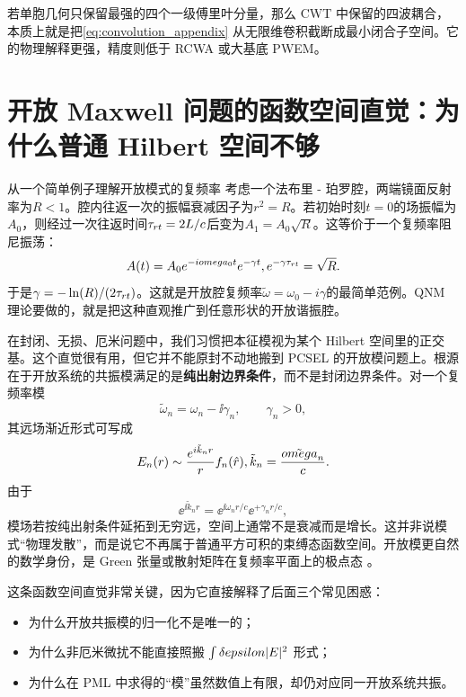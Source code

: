 若单胞几何只保留最强的四个一级傅里叶分量，那么 CWT 中保留的四波耦合，本质上就是把\cref{eq:convolution_appendix} 从无限维卷积截断成最小闭合子空间。它的物理解释更强，精度则低于 RCWA 或大基底 PWEM。

\section{开放 Maxwell 问题的函数空间直觉：为什么普通 Hilbert 空间不够}

\begin{PrerequisiteBox}{从一个简单例子理解开放模式的复频率}
考虑一个法布里 - 珀罗腔，两端镜面反射率为$R<1$。腔内往返一次的振幅衰减因子为$r^2=R$。若初始时刻$t=0$的场振幅为$A_0$，则经过一次往返时间$\tau_{\rm rt}=2L/c$后变为$A_1=A_0\sqrt{R}$。这等价于一个复频率阻尼振荡：
\[
A(t) = A_0\ee^{-\ii\omega_0 t}\ee^{-\gamma t},\qquad
\ee^{-\gamma\tau_{\rm rt}} = \sqrt{R}.
\]
于是$\gamma = -\ln(R)/(2\tau_{\rm rt})$。这就是开放腔复频率$\tilde{\omega}=\omega_0-i\gamma$的最简单范例。QNM 理论要做的，就是把这种直观推广到任意形状的开放谐振腔。
\end{PrerequisiteBox}

在封闭、无损、厄米问题中，我们习惯把本征模视为某个 Hilbert 空间里的正交基。这个直觉很有用，但它并不能原封不动地搬到 PCSEL 的开放模问题上。根源在于开放系统的共振模满足的是\textbf{纯出射边界条件}，而不是封闭边界条件。对一个复频率模
\begin{equation}
\tilde{\omega}_n=\omega_n-\ii\gamma_n,
\qquad \gamma_n>0,
\label{eq:complex_frequency_qnm_appendix}
\end{equation}
其远场渐近形式可写成
\begin{equation}
\E_n(\rvec)\sim \frac{\ee^{\ii \tilde{k}_n r}}{r}\bm{f}_n(\hat{\rvec}),
\qquad
\tilde{k}_n=\frac{\tilde{\omega}_n}{c}.
\label{eq:qnm_asymptotic_appendix}
\end{equation}
由于
\begin{equation}
\ee^{\ii \tilde{k}_n r}
=
\ee^{\ii \omega_n r/c}\ee^{+\gamma_n r/c},
\label{eq:qnm_spatial_growth_appendix}
\end{equation}
模场若按纯出射条件延拓到无穷远，空间上通常不是衰减而是增长。这并非说模式“物理发散”，而是说它不再属于普通平方可积的束缚态函数空间。开放模更自然的数学身份，是 Green 张量或散射矩阵在复频率平面上的极点态 \cite{leung1994complete,alpeggiani2017qnm}。

这条函数空间直觉非常关键，因为它直接解释了后面三个常见困惑：
\begin{itemize}
  \item 为什么开放共振模的归一化不是唯一的；
  \item 为什么非厄米微扰不能直接照搬 $\int \delta epsilon |E|^2$ 形式；
  \item 为什么在 PML 中求得的“模”虽然数值上有限，却仍对应同一开放系统共振。
\end{itemize}

